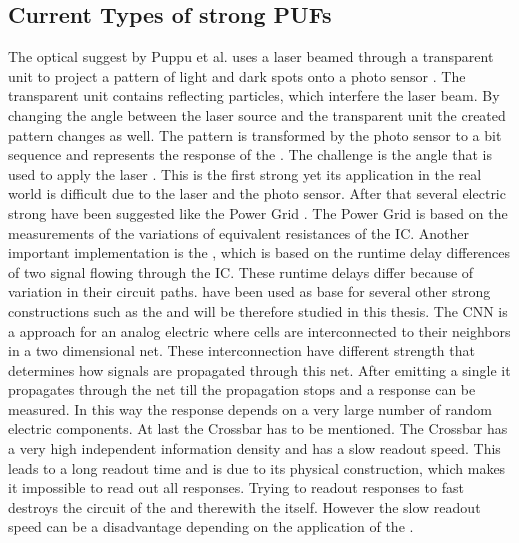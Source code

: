 \subsection{Current Types of strong PUFs}
\label{sec:typesofpufs}

The optical \puf suggest by Puppu et al. uses a laser beamed through a transparent unit to project a pattern of light and dark spots onto a photo sensor \cite{Pappu2001PhysicalFunctions}.
The transparent unit contains reflecting particles, which interfere the laser beam.
By changing the angle between the laser source and the transparent unit the created pattern changes as well.
The pattern is transformed by the photo sensor to a bit sequence and represents the response of the \puf.
The challenge is the angle that is used to apply the laser \cite{Pappu2001PhysicalFunctions}.
This is the first strong \puf yet its application in the real world is difficult due to the laser and the photo sensor.
After that several electric strong \puf have been suggested like the Power Grid \puf.
The Power Grid \puf is based on the measurements of the variations of equivalent resistances of the \ac{IC}. %
Another important implementation is the \apuf, which is based on the runtime delay differences of two signal flowing through the \ac{IC}.
These runtime delays differ because of variation in their circuit paths.
\apufs have been used as base for several other strong \puf constructions such as the \xpuf and will be therefore studied in this thesis. %
The \ac{CNN} \puf is a approach for an analog electric \puf where cells are interconnected to their neighbors in a two dimensional net.
These interconnection have different strength that determines how signals are propagated through this net.
After emitting a single it propagates through the net till the propagation stops and a response can be measured.
In this way the response depends on a very large number of random electric components. %
At last the Crossbar \puf has to be mentioned.
The Crossbar \puf has a very high independent information density and has a slow readout speed.
This leads to a long readout time and is due to its physical construction, which makes it impossible to read out all responses. 
Trying to readout responses to fast destroys the circuit of the \puf and therewith the \puf itself.
However the slow readout speed can be a disadvantage depending on the application of the \puf. %

